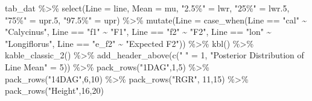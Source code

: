 \documentclass[
  letterpaper,
  DIV=11,
  numbers=noendperiod]{scrartcl}
\newenvironment{Shaded}{\begin{snugshade}}{\end{snugshade}}
\newcommand{\AttributeTok}[1]{\textcolor[rgb]{0.40,0.45,0.13}{#1}}
\newcommand{\DecValTok}[1]{\textcolor[rgb]{0.68,0.00,0.00}{#1}}
\newcommand{\FloatTok}[1]{\textcolor[rgb]{0.68,0.00,0.00}{#1}}
\newcommand{\FunctionTok}[1]{\textcolor[rgb]{0.28,0.35,0.67}{#1}}
\newcommand{\NormalTok}[1]{\textcolor[rgb]{0.00,0.23,0.31}{#1}}
\newcommand{\OtherTok}[1]{\textcolor[rgb]{0.00,0.23,0.31}{#1}}
\newcommand{\SpecialCharTok}[1]{\textcolor[rgb]{0.37,0.37,0.37}{#1}}
\newcommand{\StringTok}[1]{\textcolor[rgb]{0.13,0.47,0.30}{#1}}
\begin{document}
\begin{Shaded}
\begin{Highlighting}[]
\NormalTok{tab\_dat }\SpecialCharTok{\%\textgreater{}\%} 
  \FunctionTok{select}\NormalTok{(}\AttributeTok{Line =}\NormalTok{ line, }\AttributeTok{Mean =}\NormalTok{ mu, }\StringTok{"2.5\%"} \OtherTok{=}\NormalTok{ lwr, }\StringTok{"25\%"} \OtherTok{=}\NormalTok{ lwr}\FloatTok{.5}\NormalTok{,}
         \StringTok{"75\%"} \OtherTok{=}\NormalTok{ upr}\FloatTok{.5}\NormalTok{, }\StringTok{"97.5\%"} \OtherTok{=}\NormalTok{ upr) }\SpecialCharTok{\%\textgreater{}\%} 
  \FunctionTok{mutate}\NormalTok{(}\AttributeTok{Line =} \FunctionTok{case\_when}\NormalTok{(Line }\SpecialCharTok{==} \StringTok{"cal"} \SpecialCharTok{\textasciitilde{}} \StringTok{"Calycinus"}\NormalTok{,}
\NormalTok{                          Line }\SpecialCharTok{==} \StringTok{"f1"} \SpecialCharTok{\textasciitilde{}} \StringTok{"F1"}\NormalTok{,}
\NormalTok{                          Line }\SpecialCharTok{==} \StringTok{"f2"} \SpecialCharTok{\textasciitilde{}} \StringTok{"F2"}\NormalTok{,}
\NormalTok{                          Line }\SpecialCharTok{==} \StringTok{"lon"} \SpecialCharTok{\textasciitilde{}} \StringTok{"Longiflorus"}\NormalTok{,}
\NormalTok{                          Line }\SpecialCharTok{==} \StringTok{"e\_f2"} \SpecialCharTok{\textasciitilde{}} \StringTok{"Expected F2"}\NormalTok{)) }\SpecialCharTok{\%\textgreater{}\%} 
  \FunctionTok{kbl}\NormalTok{() }\SpecialCharTok{\%\textgreater{}\%} 
  \FunctionTok{kable\_classic\_2}\NormalTok{() }\SpecialCharTok{\%\textgreater{}\%} 
  \FunctionTok{add\_header\_above}\NormalTok{(}\FunctionTok{c}\NormalTok{(}\StringTok{" "} \OtherTok{=} \DecValTok{1}\NormalTok{, }\StringTok{"Posterior Distribution of Line Mean"} \OtherTok{=} \DecValTok{5}\NormalTok{)) }\SpecialCharTok{\%\textgreater{}\%}
  \FunctionTok{pack\_rows}\NormalTok{(}\StringTok{"1DAG"}\NormalTok{,}\DecValTok{1}\NormalTok{,}\DecValTok{5}\NormalTok{) }\SpecialCharTok{\%\textgreater{}\%}
  \FunctionTok{pack\_rows}\NormalTok{(}\StringTok{"14DAG"}\NormalTok{,}\DecValTok{6}\NormalTok{,}\DecValTok{10}\NormalTok{) }\SpecialCharTok{\%\textgreater{}\%}
  \FunctionTok{pack\_rows}\NormalTok{(}\StringTok{"RGR"}\NormalTok{, }\DecValTok{11}\NormalTok{,}\DecValTok{15}\NormalTok{) }\SpecialCharTok{\%\textgreater{}\%}
  \FunctionTok{pack\_rows}\NormalTok{(}\StringTok{"Height"}\NormalTok{,}\DecValTok{16}\NormalTok{,}\DecValTok{20}\NormalTok{)}
\end{Highlighting}
\end{Shaded}
\end{document}
